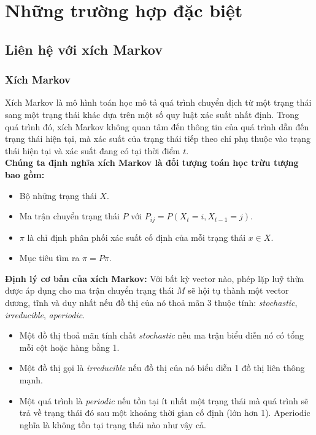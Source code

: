 \chapter{Những trường hợp đặc biệt}

\section{Liên hệ với xích Markov}

\subsection{Xích Markov}
Xích Markov là mô hình toán học mô tả quá trình chuyển dịch từ một trạng thái sang một trạng thái khác dựa trên một số quy luật xác suất nhất định. Trong quá trình đó, xích Markov không quan tâm đến thông tin của quá trình dẫn đến trạng thái hiện tại, mà xác suất của trạng thái tiếp theo chỉ phụ thuộc vào trạng thái hiện tại và xác suất đang có tại thời điểm $t$.\\[10pt]
\textbf{Chúng ta định nghĩa xích Markov là đối tượng toán học trừu tượng bao gồm:} 
\begin{itemize}
    \item Bộ những trạng thái $X$.
    \item Ma trận chuyển trạng thái $P$ với $P_{ij} = P (X_t = i, X_{t-1} =j)$.
    \item $\pi$ là chỉ định phân phối xác suất cố định của mỗi trạng thái $x \in X$.
    \item Mục tiêu tìm ra $\pi = P \pi$.
\end{itemize}
\textbf{Định lý cơ bản của xích Markov:} Với bất kỳ vector nào, phép lặp luỹ thừa được áp dụng cho ma trận chuyển trạng thái $M$ sẽ hội tụ thành một vector dương, tĩnh và duy nhất nếu đồ thị của nó thoả mãn 3 thuộc tính: \emph{stochastic}, \emph{irreducible}, \emph{aperiodic}.
\begin{itemize}
    \item Một đồ thị thoả mãn tính chất \textit{stochastic} nếu ma trận biểu diễn nó có tổng mỗi cột hoặc hàng bằng 1. 
    \item Một đồ thị gọi là \emph{irreducible} nếu đồ thị của nó biểu diễn 1 đồ thị liên thông mạnh.
    \item  Một quá trình là \emph{periodic} nếu tồn tại ít nhất một trạng thái mà quá trình sẽ trả về trạng thái đó sau một khoảng thời gian cố định (lớn hơn 1). Aperiodic nghĩa là không tồn tại trạng thái nào như vậy cả.
\end{itemize}

